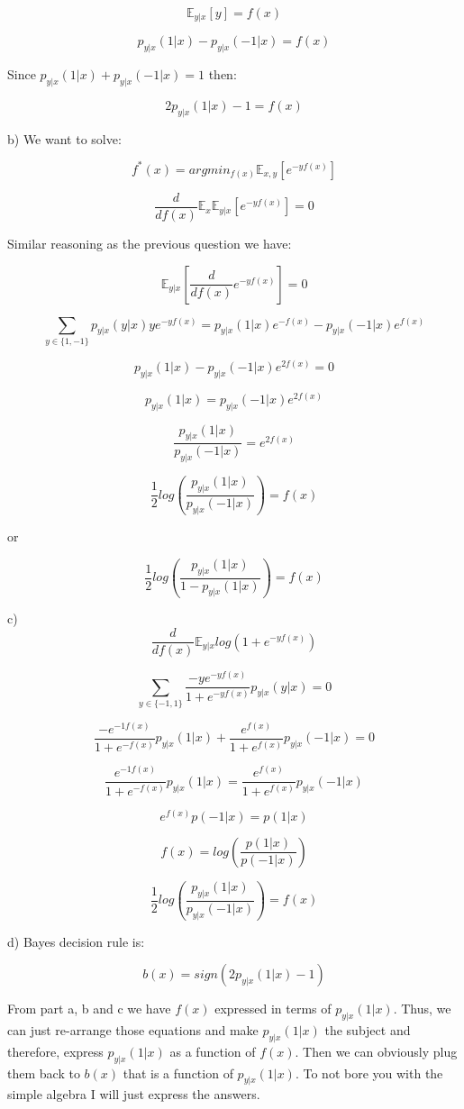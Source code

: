 \documentclass[12pt]{report}
\begin{document}
$$\mathbb{E}_{y|x}[y] = f(x) $$

$$p_{y|x}(1|x) - p_{y|x}(-1|x) = f(x)$$

Since $p_{y|x}(1|x) + p_{y|x}(-1|x) = 1$ then:

$$2p_{y|x}(1|x) - 1 = f(x) $$

b) We want to solve:

$$f^{*}(x) =  argmin_{f(x)} \mathbb{E}_{x,y}[e^{-yf(x)}]$$

$$\frac{d}{df(x)}\mathbb{E}_{x}\mathbb{E}_{y|x} [e^{-yf(x)}] = 0 $$

Similar reasoning as the previous question we have:

$$\mathbb{E}_{y|x} \left[ \frac{d}{df(x)}e^{-yf(x)} \right] = 0 $$

$$\sum_{y \in \{1, -1 \}}p_{y|x}(y|x)ye^{-yf(x)} = p_{y|x}(1|x)e^{-f(x)} - p_{y|x}(-1|x)e^{f(x)}$$

$$p_{y|x}(1|x) - p_{y|x}(-1|x)e^{2f(x)} = 0$$

$$p_{y|x}(1|x) = p_{y|x}(-1|x)e^{2f(x)}$$

$$\frac{p_{y|x}(1|x)}{p_{y|x}(-1|x)} = e^{2f(x)}$$

$$\frac{1}{2}log\left( \frac{p_{y|x}(1|x)}{p_{y|x}(-1|x)} \right) = f(x)$$

or 

$$\frac{1}{2}log\left( \frac{p_{y|x}(1|x)}{1 - p_{y|x}(1|x)} \right) = f(x)$$

c) 
$$ \frac{d}{df(x)}\mathbb{E}_{y|x}log(1 + e^{-yf(x)})$$

$$\sum_{y \in \{ -1, 1\}} \frac{-ye^{-yf(x)}}{1+e^{-yf(x)}}p_{y|x}(y|x) = 0$$

$$\frac{-e^{-1f(x)}}{1+e^{-f(x)}}p_{y|x}(1|x) + \frac{e^{f(x)}}{1+e^{f(x)}}p_{y|x}(-1|x) = 0$$

$$\frac{e^{-1f(x)}}{1+e^{-f(x)}}p_{y|x}(1|x) = \frac{e^{f(x)}}{1+e^{f(x)}}p_{y|x}(-1|x)$$

$$e^{f(x)} p(-1|x) = p(1|x)$$

$$f(x)  = log \left( \frac{ p(1|x) }{ p(-1|x) } \right) $$

$$\frac{1}{2}log\left( \frac{p_{y|x}(1|x)}{p_{y|x}(-1|x)} \right) = f(x)$$

d) Bayes decision rule is:

$$ b(x) = sign(2p_{y|x}(1|x) -1)$$

From part a, b and c we have $f(x)$ expressed in terms of $p_{y|x}(1|x)$. Thus, we can just re-arrange those equations and make $p_{y|x}(1|x)$ the subject and therefore, express $p_{y|x}(1|x)$ as a function of $f(x)$. Then we can obviously plug them back to $b(x)$ that is a function of $p_{y|x}(1|x)$. To not bore you with the simple algebra I will just express the answers.
\end{document}
